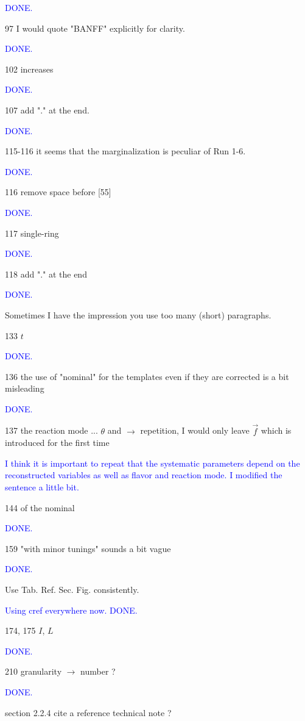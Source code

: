 \documentclass[final]{elsarticle}
\begin{document}
\textcolor{blue}{DONE.}

97 I would quote "BANFF" explicitly for clarity.

\textcolor{blue}{DONE.}

102 increases

\textcolor{blue}{DONE.}

107 add "." at the end.

\textcolor{blue}{DONE.}

115-116 it seems that the marginalization is peculiar of Run 1-6.

\textcolor{blue}{DONE.}

116 remove space before [55]

\textcolor{blue}{DONE.}

117 single-ring

\textcolor{blue}{DONE.}

118 add "." at the end

\textcolor{blue}{DONE.}

Sometimes I have the impression you use too many (short) paragraphs.

133 $t$

\textcolor{blue}{DONE.}

136 the use of "nominal" for the templates even if they are corrected is a bit misleading

\textcolor{blue}{DONE.}

137 the reaction mode ... $\theta$ and $\rightarrow$ repetition, I would only leave $\vec{f}$ which is introduced for the first time

\textcolor{blue}{I think it is important to repeat that the systematic parameters depend on the reconstructed variables
as well as flavor and reaction mode. I modified the sentence a little bit.}

144 of the nominal

\textcolor{blue}{DONE.}

159 "with minor tunings" sounds a bit vague

\textcolor{blue}{DONE.}

Use Tab. Ref. Sec. Fig. consistently.

\textcolor{blue}{Using cref everywhere now. DONE.}

174, 175 $I$, $L$

\textcolor{blue}{DONE.}

210 granularity $\rightarrow$ number ?

\textcolor{blue}{DONE.}

section 2.2.4 cite a reference technical note ?
\end{document}
